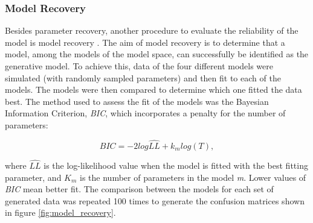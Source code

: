 \documentclass[a4paper,12pt]{article}
\begin{document}
\subsubsection{Model Recovery}
Besides parameter recovery, another procedure to evaluate the reliability of the model is model recovery \citep{Wilson2019a}. The aim of model recovery is to determine that a model, among the models of the model space, can successfully be identified as the generative model. To achieve this, data of the four different models were simulated (with randomly sampled parameters) and then fit to each of the models. The models were then compared to determine which one fitted the data best. The method used to assess the fit of the models was the Bayesian Information Criterion, \textit{BIC}, which incorporates a penalty for the number of parameters:

\begin{equation}
BIC = {-2}log \hat{LL} + k_m log{(T)},
\label{eq:BIC}
\end{equation}

\noindent
where $\hat{LL}$ is the log-likelihood value when the model is fitted with the best fitting parameter, and $K_m$ is the number of parameters in the model \textit{m}. Lower values of \textit{BIC} mean better fit. The comparison between the models for each set of generated data was repeated 100 times to generate the confusion matrices shown in figure \ref{fig:model_recovery}.



\end{document}
